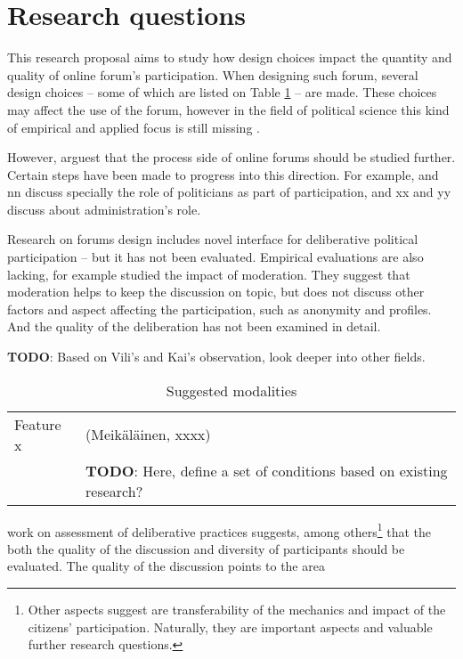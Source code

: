 \documentclass[journal,a4paper]{IEEEtran}
\begin{document}
\section{Research questions}

This research proposal aims to study how design choices impact the quantity and quality of online forum's participation. When designing such forum, several design choices -- some of which are listed on Table \ref{tab:modalities} -- are made. These choices may affect the use of the forum, however in the field of political science this kind of empirical and applied focus is still missing \cite[256]{wright12}.

However,  arguest that the process side of online forums should be studied further. Certain steps have been made to progress into this direction. For example,  and nn discuss specially the role of politicians as part of participation, and xx and yy discuss about administration's role.

Research on forums design includes  novel interface for deliberative political participation -- but it has not been evaluated. Empirical evaluations are also lacking, for example  studied the impact of moderation. They suggest that moderation helps to keep the discussion on topic, but does not discuss other factors and aspect affecting the participation, such as anonymity and profiles. And the quality of the deliberation has not been examined in detail.

\textbf{TODO}: Based on Vili's and Kai's observation, look deeper into other fields.

\begin{table}
\caption{Suggested modalities}
\begin{tabular}{ll}
Feature x & (Meikäläinen, xxxx)  \\ 
 & \textbf{TODO}: Here, define a set of conditions based on existing research?  \\ 
\end{tabular} 
\label{tab:modalities}
\end{table}

 work on assessment of deliberative practices suggests, among others\footnote{Other aspects  suggest are transferability of the mechanics and impact of the citizens' participation. Naturally, they are important aspects and valuable further research questions.} that the both the quality of the discussion and diversity of participants should be evaluated. The quality of the discussion points to the area
\end{document}
